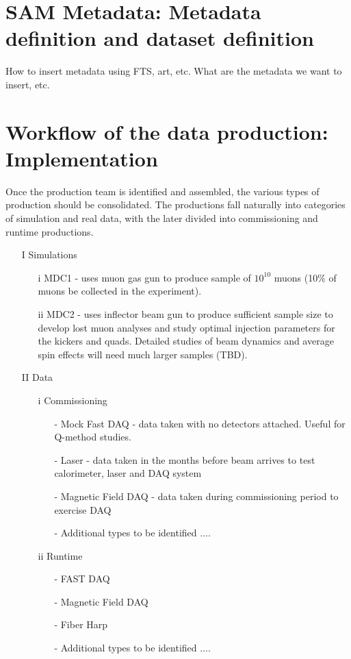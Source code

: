 \section{SAM Metadata: Metadata definition and dataset definition}
How to insert metadata using FTS, art, etc. What are the metadata we want to insert, etc.

\section{Workflow of the data production: Implementation }

Once the production team is identified and assembled, the various types of production should be consolidated. The productions fall naturally into categories of simulation and real data, with the later divided into commissioning and runtime productions. 

\begin{itemize}

\item[I] Simulations
 \begin{itemize}
 	\item[i] MDC1 -  uses muon gas gun to produce sample of  $10^{10}$ muons (10$\%$ of muons  be collected in the experiment).
         \item[ii] MDC2 - uses inflector beam gun to produce sufficient sample size to develop lost muon analyses and study optimal  injection parameters for the kickers and quads. Detailed studies of beam dynamics and average spin effects will need much larger samples (TBD).
\end{itemize}

\item[II] Data
\begin{itemize}
 	\item[i]  Commissioning
		\begin{itemize}
		 \item[-] Mock Fast DAQ -  data taken with no detectors attached. Useful for Q-method studies.
		 \item[-] Laser - data taken in the months before beam arrives to test calorimeter, laser and DAQ system
		 \item[-] Magnetic Field DAQ - data taken during commissioning period to exercise DAQ
		 \item[-] Additional types to be identified ....
		 \end{itemize}
         \item[ii] Runtime
         \begin{itemize}
		 \item[-] FAST DAQ 
		 \item[-] Magnetic Field DAQ 		
		 \item[-] Fiber Harp
		 \item[-] Additional types to be identified ....
	\end{itemize}
\end{itemize}

\end{itemize}

